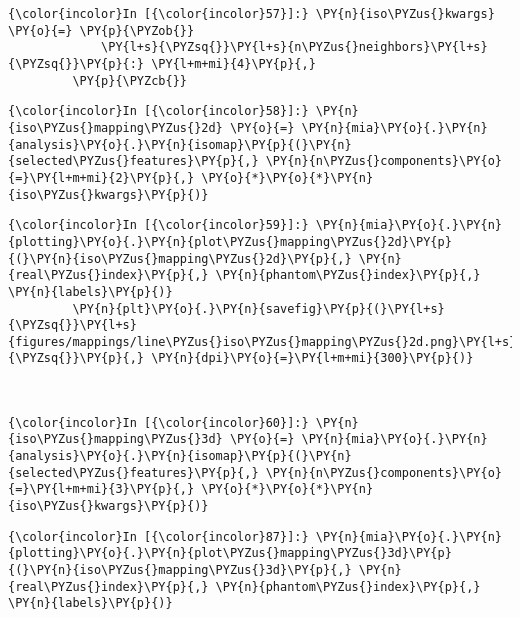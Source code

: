     \begin{Verbatim}[commandchars=\\\{\}]
{\color{incolor}In [{\color{incolor}57}]:} \PY{n}{iso\PYZus{}kwargs} \PY{o}{=} \PY{p}{\PYZob{}}
             \PY{l+s}{\PYZsq{}}\PY{l+s}{n\PYZus{}neighbors}\PY{l+s}{\PYZsq{}}\PY{p}{:} \PY{l+m+mi}{4}\PY{p}{,}
         \PY{p}{\PYZcb{}}
\end{Verbatim}

    \begin{Verbatim}[commandchars=\\\{\}]
{\color{incolor}In [{\color{incolor}58}]:} \PY{n}{iso\PYZus{}mapping\PYZus{}2d} \PY{o}{=} \PY{n}{mia}\PY{o}{.}\PY{n}{analysis}\PY{o}{.}\PY{n}{isomap}\PY{p}{(}\PY{n}{selected\PYZus{}features}\PY{p}{,} \PY{n}{n\PYZus{}components}\PY{o}{=}\PY{l+m+mi}{2}\PY{p}{,} \PY{o}{*}\PY{o}{*}\PY{n}{iso\PYZus{}kwargs}\PY{p}{)}
\end{Verbatim}

    \begin{Verbatim}[commandchars=\\\{\}]
{\color{incolor}In [{\color{incolor}59}]:} \PY{n}{mia}\PY{o}{.}\PY{n}{plotting}\PY{o}{.}\PY{n}{plot\PYZus{}mapping\PYZus{}2d}\PY{p}{(}\PY{n}{iso\PYZus{}mapping\PYZus{}2d}\PY{p}{,} \PY{n}{real\PYZus{}index}\PY{p}{,} \PY{n}{phantom\PYZus{}index}\PY{p}{,} \PY{n}{labels}\PY{p}{)}
         \PY{n}{plt}\PY{o}{.}\PY{n}{savefig}\PY{p}{(}\PY{l+s}{\PYZsq{}}\PY{l+s}{figures/mappings/line\PYZus{}iso\PYZus{}mapping\PYZus{}2d.png}\PY{l+s}{\PYZsq{}}\PY{p}{,} \PY{n}{dpi}\PY{o}{=}\PY{l+m+mi}{300}\PY{p}{)}
\end{Verbatim}

    \begin{center}
    \end{center}
    { \hspace*{\fill} \\}

    \begin{Verbatim}[commandchars=\\\{\}]
{\color{incolor}In [{\color{incolor}60}]:} \PY{n}{iso\PYZus{}mapping\PYZus{}3d} \PY{o}{=} \PY{n}{mia}\PY{o}{.}\PY{n}{analysis}\PY{o}{.}\PY{n}{isomap}\PY{p}{(}\PY{n}{selected\PYZus{}features}\PY{p}{,} \PY{n}{n\PYZus{}components}\PY{o}{=}\PY{l+m+mi}{3}\PY{p}{,} \PY{o}{*}\PY{o}{*}\PY{n}{iso\PYZus{}kwargs}\PY{p}{)}
\end{Verbatim}

    \begin{Verbatim}[commandchars=\\\{\}]
{\color{incolor}In [{\color{incolor}87}]:} \PY{n}{mia}\PY{o}{.}\PY{n}{plotting}\PY{o}{.}\PY{n}{plot\PYZus{}mapping\PYZus{}3d}\PY{p}{(}\PY{n}{iso\PYZus{}mapping\PYZus{}3d}\PY{p}{,} \PY{n}{real\PYZus{}index}\PY{p}{,} \PY{n}{phantom\PYZus{}index}\PY{p}{,} \PY{n}{labels}\PY{p}{)}
\end{Verbatim}

